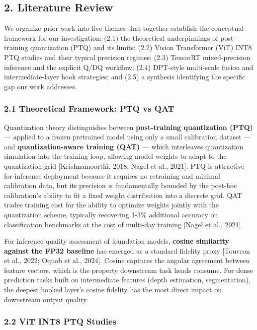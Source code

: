 \documentclass[
]{article}
\begin{document}
\subsection{2. Literature Review}\label{literature-review}

We organize prior work into five themes that together establish the
conceptual framework for our investigation: (2.1) the theoretical
underpinnings of post-training quantization (PTQ) and its limits; (2.2)
Vision Transformer (ViT) INT8 PTQ studies and their typical precision
regimes; (2.3) TensorRT mixed-precision inference and the explicit Q/DQ
workflow; (2.4) DPT-style multi-scale fusion and intermediate-layer hook
strategies; and (2.5) a synthesis identifying the specific gap our work
addresses.

\subsubsection{2.1 Theoretical Framework: PTQ vs
QAT}\label{theoretical-framework-ptq-vs-qat}

Quantization theory distinguishes between \textbf{post-training
quantization (PTQ)} --- applied to a frozen pretrained model using only
a small calibration dataset --- and \textbf{quantization-aware training
(QAT)} --- which interleaves quantization simulation into the training
loop, allowing model weights to adapt to the quantization grid
{[}Krishnamoorthi, 2018; Nagel et al., 2021{]}. PTQ is attractive for
inference deployment because it requires no retraining and minimal
calibration data, but its precision is fundamentally bounded by the
post-hoc calibration's ability to fit a fixed weight distribution into a
discrete grid. QAT trades training cost for the ability to optimize
weights jointly with the quantization scheme, typically recovering 1-3\%
additional accuracy on classification benchmarks at the cost of
multi-day training {[}Nagel et al., 2021{]}.

For inference quality assessment of foundation models, \textbf{cosine
similarity against the FP32 baseline} has emerged as a standard fidelity
proxy {[}Touvron et al., 2022; Oquab et al., 2024{]}. Cosine captures
the angular agreement between feature vectors, which is the property
downstream task heads consume. For dense prediction tasks built on
intermediate features (depth estimation, segmentation), the deepest
hooked layer's cosine fidelity has the most direct impact on downstream
output quality.

\subsubsection{2.2 ViT INT8 PTQ Studies}\label{vit-int8-ptq-studies}
\end{document}
